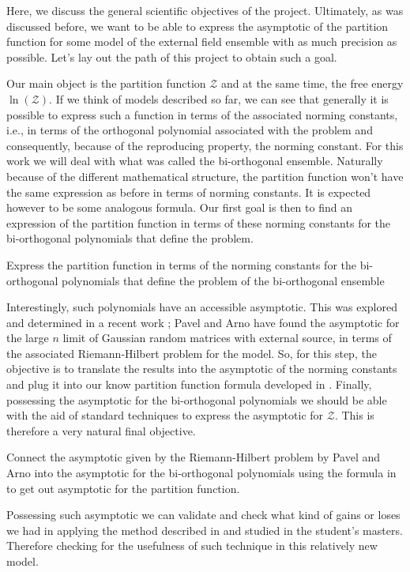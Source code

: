 Here, we discuss the general scientific objectives of the project. Ultimately, as was discussed before, we want to be able to express the asymptotic of the partition function for some model of the external field ensemble with as much precision as possible. Let's lay out the path of this project to obtain such a goal.

Our main object is the partition function $\mathcal{Z}$ and at the same time, the free energy $\ln(\mathcal{Z})$. If we think of models described so far, we can see that generally it is possible to express such a function in terms of the associated norming constants, i.e., in terms of the orthogonal polynomial associated with the problem and consequently, because of the reproducing property, the norming constant. For this work we will deal with what was called the bi-orthogonal ensemble. Naturally because of the different mathematical structure, the partition function won't have the same expression as before in terms of norming constants. It is expected however to be some analogous formula. Our first goal is then to find an expression of the partition function in terms of these norming constants for the bi-orthogonal polynomials that define the problem. 

\begin{tcolorbox}
	Express the partition function in terms of the norming constants for the bi-orthogonal polynomials that define the problem of the bi-orthogonal ensemble
\end{tcolorbox}

Interestingly, such polynomials have an accessible asymptotic. This was explored and determined in a recent work \cite{Bleher_2006}; Pavel and Arno have found the asymptotic for the large $n$ limit of Gaussian random matrices with external source, in terms of the associated Riemann-Hilbert problem for the model. So, for this step, the objective is to translate the results into the asymptotic of the norming constants and plug it into our know partition function formula developed in \cite{Byun_2023}. Finally, possessing the asymptotic for the bi-orthogonal polynomials we should be able with the aid of standard techniques to express the asymptotic for $\mathcal{Z}$.  This is therefore a very natural final objective.

\begin{tcolorbox}
	Connect the asymptotic given by the Riemann-Hilbert problem by Pavel and Arno into the asymptotic for the bi-orthogonal polynomials using the formula in \cite{Byun_2023} to get out asymptotic for the partition function.
\end{tcolorbox}

Possessing such asymptotic we can validate and check what kind of gains or loses we had in applying the method described in \cite{Byun_2023} and studied in the student's masters. Therefore checking for the usefulness of such technique in this relatively new model.